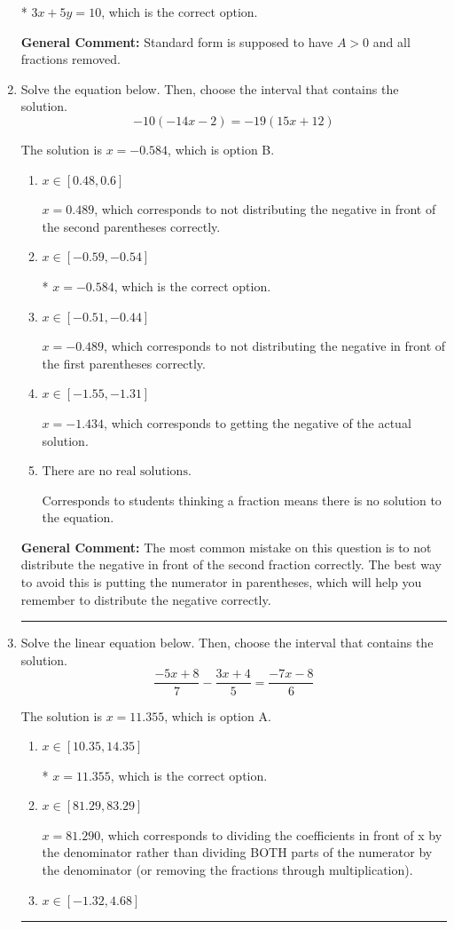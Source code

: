 \documentclass{extbook}[14pt]
\newcommand{\litem}[1]{\item #1

\rule{\textwidth}{0.4pt}}
\begin{document}
\begin{enumerate}
{\begin{enumerate}[label=\Alph*.]
* $3x + 5y = 10$, which is the correct option.
\end{enumerate}

\textbf{General Comment:} Standard form is supposed to have $A > 0$ and all fractions removed.
}
\litem{
Solve the equation below. Then, choose the interval that contains the solution.
\[ -10(-14x -2) = -19(15x + 12) \]

The solution is \( x = -0.584 \), which is option B.\begin{enumerate}[label=\Alph*.]
\item \( x \in [0.48, 0.6] \)

$x = 0.489$, which corresponds to not distributing the negative in front of the second parentheses correctly.
\item \( x \in [-0.59, -0.54] \)

* $x = -0.584$, which is the correct option.
\item \( x \in [-0.51, -0.44] \)

$x = -0.489$, which corresponds to not distributing the negative in front of the first parentheses correctly.
\item \( x \in [-1.55, -1.31] \)

$x = -1.434$, which corresponds to getting the negative of the actual solution.
\item \( \text{There are no real solutions.} \)

Corresponds to students thinking a fraction means there is no solution to the equation.
\end{enumerate}

\textbf{General Comment:} The most common mistake on this question is to not distribute the negative in front of the second fraction correctly. The best way to avoid this is putting the numerator in parentheses, which will help you remember to distribute the negative correctly.
}
\litem{
Solve the linear equation below. Then, choose the interval that contains the solution.
\[ \frac{-5x + 8}{7} - \frac{3x + 4}{5} = \frac{-7x -8}{6} \]

The solution is \( x = 11.355 \), which is option A.\begin{enumerate}[label=\Alph*.]
\item \( x \in [10.35, 14.35] \)

* $x = 11.355$, which is the correct option.
\item \( x \in [81.29, 83.29] \)

 $x = 81.290$, which corresponds to dividing the coefficients in front of x by the denominator rather than dividing BOTH parts of the numerator by the denominator (or removing the fractions through multiplication).
\item \( x \in [-1.32, 4.68] \)


\end{enumerate}}
\end{enumerate}
\end{document}
